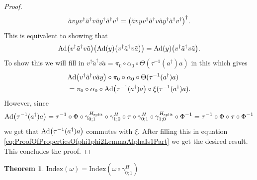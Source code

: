 \documentclass[12pt,a4paper,twoside]{article}
\let\originalleft\left
\let\originalright\right
\renewcommand{\left}{\mathopen{}\mathclose\bgroup\originalleft}
\renewcommand{\right}{\aftergroup\egroup\originalright}
\newcommand{\Ad}[1]{\textrm{Ad}\left(#1\right)}
\theoremstyle{definition}
\newtheorem{theorem}{Theorem}[section]
\numberwithin{equation}{section}
\begin{document}
\begin{proof}
\begin{equation}
		\tilde{a}vyv^\dagger\tilde{a}^\dagger v \tilde{a}y^\dagger\tilde{a}^\dagger  v^\dagger=\left(\tilde{a}vyv^\dagger\tilde{a}^\dagger v \tilde{a}y^\dagger\tilde{a}^\dagger  v^\dagger\right)^\dagger.
	\end{equation}
	This is equivalent to showing that
	\begin{equation}
		\Ad{v^\dagger \tilde{a}^\dagger v\tilde{a}}\left(\Ad{y}\left(v^\dagger \tilde{a}^\dagger v \tilde{a}\right)\right)=\Ad{y}\left(v^\dagger \tilde{a}^\dagger v \tilde{a}\right).
	\end{equation}
	To show this we will fill in $v^\dagger\tilde{a}^\dagger v\tilde{a}=\pi_0\circ\alpha_0\circ\Theta(\tau^{-1}(a^\dagger)a)$ in this which gives
	\begin{align}
		&\Ad{v^\dagger \tilde{a}^\dagger v\tilde{a} y}\circ \pi_0\circ\alpha_0\circ\Theta(\tau^{-1}(a^\dagger)a)\\
		\label{eq:ProofOfPropertiesOfphi1phi2LemmaAlphaIs1Part}
		&=\pi_0\circ\alpha_0\circ\Ad{\tau^{-1}(a^\dagger)a}\circ\xi(\tau^{-1}(a^\dagger)a).
	\end{align}
	However, since
	\begin{equation}
		\Ad{\tau^{-1}(a^\dagger)a}=\tau^{-1}\circ\Phi\circ\gamma^{H_{\text{split}}}_{0;1}\circ\gamma^H_{1;0}\circ\tau\circ\gamma^H_{0;1}\circ\gamma^{H_{\text{split}}}_{1;0}\circ\Phi^{-1}=\tau^{-1}\circ\Phi\circ\tau\circ\Phi^{-1}
	\end{equation}
	we get that $\Ad{\tau^{-1}(a^\dagger)a}$ commutes with $\xi$. After filling this in equation \eqref{eq:ProofOfPropertiesOfphi1phi2LemmaAlphaIs1Part} we get the desired result. This concludes the proof.
\end{proof}
\begin{theorem}\label{thrm:IndexInvariantUnderLGA}
	$\textrm{Index}(\omega)=\textrm{Index}(\omega\circ\gamma^H_{0;1})$
\end{theorem}
\end{document}
